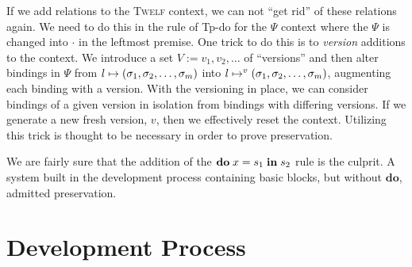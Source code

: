 \documentclass[a4paper, oneside, 10pt, draft]{memoir}
\newcommand{\twelf}{\textsc{Twelf}}
\begin{document}
If we add relations to the \twelf{} context, we can not ``get rid'' of
these relations again. We need to do this in the rule of Tp-do for the
$\Psi$ context where the $\Psi$ is changed into $\cdot$ in the
leftmost premise. One trick to do this is to \emph{version} additions
to the context. We introduce a set $V := v_1, v_2, \dotsc$ of
``versions'' and then alter bindings in $\Psi$ from $l \mapsto
(\sigma_1, \sigma_2, \dotsc, \sigma_m)$ into $l \mapsto^{v} (\sigma_1, \sigma_2, \dotsc, \sigma_m)$, augmenting each binding with
a version. With the versioning in place, we can consider bindings of a
given version in isolation from bindings with differing versions. If
we generate a new fresh version, $v$, then we effectively reset the
context. Utilizing this trick is thought to be necessary in order to
prove preservation.

We are fairly sure that the addition of the $\mathbf{do} \; x = s_1 \; \mathbf{in} \; s_2$ rule
is the culprit. A system built in the development process containing
basic blocks, but without $\mathbf{do}$, admitted preservation.

\chapter{Development Process}
\end{document}
